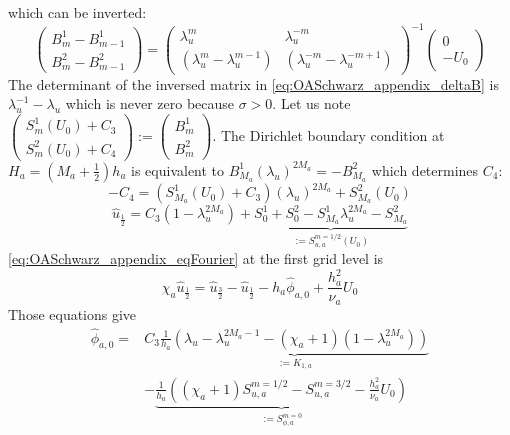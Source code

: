 which can be inverted:
\begin{equation}
	\label{eq:OASchwarz_appendix_deltaB}
	\begin{pmatrix}
B_m^1 - B_{m-1}^1\\
B_m^2 - B_{m-1}^2
	\end{pmatrix}
	=
	\begin{pmatrix}
		\lambda_u^m & \lambda_u^{-m} \\
		(\lambda_u^m - \lambda_u^{m-1})  & 
		(\lambda_u^{-m} - \lambda_u^{-m+1})
	\end{pmatrix}^{-1}
	\begin{pmatrix}
		0 \\ -U_0
	\end{pmatrix}
\end{equation}
The determinant of the inversed matrix in
\eqref{eq:OASchwarz_appendix_deltaB} is
$\lambda_u^{-1} - \lambda_u$ which is never zero because
$\sigma > 0$.
Let us note 
$\begin{pmatrix}
	S_m^1(U_0) + {C}_3\\
	S_m^2(U_0) + {C}_4
\end{pmatrix}:=\begin{pmatrix}
B_m^1\\
B_m^2
\end{pmatrix}$.
The Dirichlet boundary condition at $H_a = (M_a + \frac{1}{2})h_a$
is equivalent to
$B_{M_a}^1 (\lambda_u)^{2M_a} = - B_{M_a}^2$ which determines
${C}_4$:
\begin{equation}
- {C}_4 = \left(S_{M_a}^1(U_0) + {C}_3\right)
	(\lambda_u)^{2M_a} + S_{M_a}^2(U_0)
\end{equation}
\begin{equation}
		\widehat{u}_{\frac{1}{2}} = {C}_3 (1 - \lambda_u^{2M_a})
	+ \underbrace{S_0^1+S_0^2 - S_{M_a}^1 \lambda_u^{2M_a}
		-S_{M_a}^2}_{:=S_{u, a}^{m=1/2}(U_0)}
\end{equation}
\eqref{eq:OASchwarz_appendix_eqFourier} at the first grid level is
\begin{equation}
	\chi_a \widehat{u}_{\frac{1}{2}} =
	\widehat{u}_{\frac{3}{2}} - \widehat{u}_{\frac{1}{2}}
	- h_a \widehat{\phi}_{a,0} + \frac{h^2_a}{\nu_a} U_0
\end{equation}
Those equations give
\begin{equation}
	\begin{aligned}
		\widehat{\phi}_{a,0} =&{C}_3 \underbrace{\frac{1}{h_a}
		\left(
			\lambda_u-\lambda_u^{2M_a-1}
			- (\chi_a+1)(1-\lambda_u^{2M_a})
			\right)}_{:=K_{1,a}}\\
		&-\underbrace{\frac{1}{h_a}\left((\chi_a + 1) S_{u,a}^{m=1/2}
		- S_{u,a}^{m=3/2}
		- \frac{h_a^2}{\nu_a} U_0\right)}_{:=S_{\phi,a}^{m=0}}
	\end{aligned}
\end{equation}
